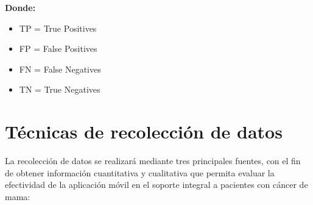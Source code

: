 \vspace{1.5 cm}


\textbf{Donde:}
\begin{itemize}
    \item TP = True Positives
    \item FP = False Positives
    \item FN = False Negatives
    \item TN = True Negatives
\end{itemize} 


\section{Técnicas de recolección de datos}


La recolección de datos se realizará mediante tres principales fuentes, con el fin de obtener información cuantitativa y cualitativa que permita evaluar la efectividad de la aplicación móvil en el soporte integral a pacientes con cáncer de mama:

